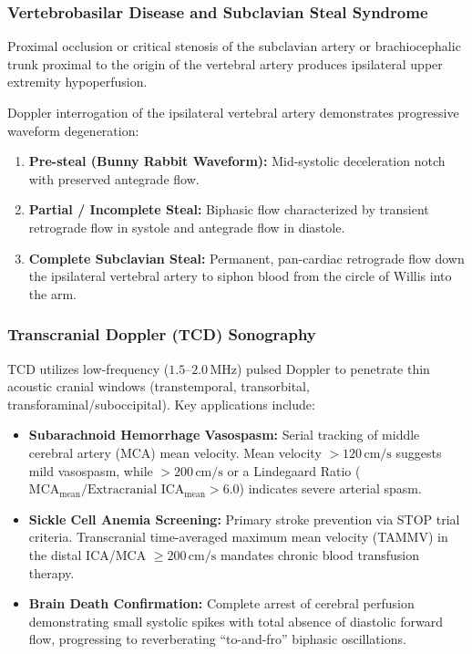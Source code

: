 \documentclass[11pt,a4paper]{article}
\begin{document}
\subsubsection{Vertebrobasilar Disease and Subclavian Steal Syndrome}
Proximal occlusion or critical stenosis of the subclavian artery or brachiocephalic trunk proximal to the origin of the vertebral artery produces ipsilateral upper extremity hypoperfusion. 

Doppler interrogation of the ipsilateral vertebral artery demonstrates progressive waveform degeneration:
\begin{enumerate}[leftmargin=*]
    \item \textbf{Pre-steal (Bunny Rabbit Waveform):} Mid-systolic deceleration notch with preserved antegrade flow.
    \item \textbf{Partial / Incomplete Steal:} Biphasic flow characterized by transient retrograde flow in systole and antegrade flow in diastole.
    \item \textbf{Complete Subclavian Steal:} Permanent, pan-cardiac retrograde flow down the ipsilateral vertebral artery to siphon blood from the circle of Willis into the arm.
\end{enumerate}

\subsubsection{Transcranial Doppler (TCD) Sonography}
TCD utilizes low-frequency ($1.5\text{--}2.0\,\text{MHz}$) pulsed Doppler to penetrate thin acoustic cranial windows (transtemporal, transorbital, transforaminal/suboccipital). Key applications include:
\begin{itemize}[leftmargin=*]
    \item \textbf{Subarachnoid Hemorrhage Vasospasm:} Serial tracking of middle cerebral artery (MCA) mean velocity. Mean velocity $> 120\,\text{cm/s}$ suggests mild vasospasm, while $> 200\,\text{cm/s}$ or a Lindegaard Ratio ($\text{MCA}_{\text{mean}} / \text{Extracranial ICA}_{\text{mean}} > 6.0$) indicates severe arterial spasm.
    \item \textbf{Sickle Cell Anemia Screening:} Primary stroke prevention via STOP trial criteria. Transcranial time-averaged maximum mean velocity (TAMMV) in the distal ICA/MCA $\ge 200\,\text{cm/s}$ mandates chronic blood transfusion therapy.
    \item \textbf{Brain Death Confirmation:} Complete arrest of cerebral perfusion demonstrating small systolic spikes with total absence of diastolic forward flow, progressing to reverberating ``to-and-fro'' biphasic oscillations.
\end{itemize}
\end{document}
